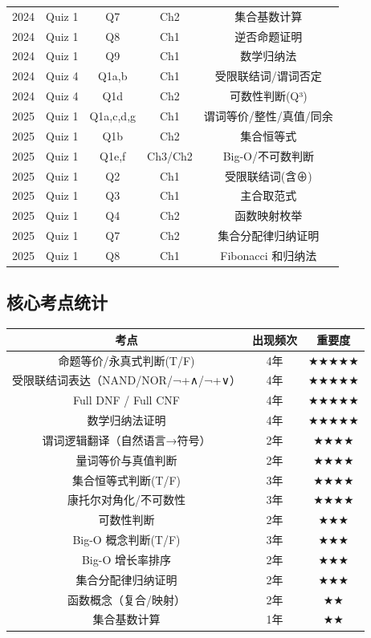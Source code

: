 \documentclass[10pt,a4paper,openany]{ctexbook}
\theoremstyle{definition}
\theoremstyle{remark}
\begin{document}
\begin{center}
\begin{tabular}{ccccc}
2024 & Quiz 1 & Q7 & Ch2 & 集合基数计算 \\
2024 & Quiz 1 & Q8 & Ch1 & 逆否命题证明 \\
2024 & Quiz 1 & Q9 & Ch1 & 数学归纳法 \\
2024 & Quiz 4 & Q1a,b & Ch1 & 受限联结词/谓词否定 \\
2024 & Quiz 4 & Q1d & Ch2 & 可数性判断(Q³) \\
2025 & Quiz 1 & Q1a,c,d,g & Ch1 & 谓词等价/整性/真值/同余 \\
2025 & Quiz 1 & Q1b & Ch2 & 集合恒等式 \\
2025 & Quiz 1 & Q1e,f & Ch3/Ch2 & Big-O/不可数判断 \\
2025 & Quiz 1 & Q2 & Ch1 & 受限联结词(含⊕) \\
2025 & Quiz 1 & Q3 & Ch1 & 主合取范式 \\
2025 & Quiz 1 & Q4 & Ch2 & 函数映射枚举 \\
2025 & Quiz 1 & Q7 & Ch2 & 集合分配律归纳证明 \\
2025 & Quiz 1 & Q8 & Ch1 & Fibonacci 和归纳法 \\
\hline
\end{tabular}

\end{center}

\vspace{-2pt}

\subsection{核心考点统计}

\begin{center}
\begin{tabular}{ccc}
\hline
考点 & 出现频次 & 重要度 \\ \hline
命题等价/永真式判断(T/F) & 4年 & ★★★★★ \\
受限联结词表达（NAND/NOR/¬+∧/¬+∨） & 4年 & ★★★★★ \\
Full DNF / Full CNF & 4年 & ★★★★★ \\
数学归纳法证明 & 4年 & ★★★★★ \\
谓词逻辑翻译（自然语言→符号） & 2年 & ★★★★ \\
量词等价与真值判断 & 2年 & ★★★★ \\
集合恒等式判断(T/F) & 3年 & ★★★★ \\
康托尔对角化/不可数性 & 3年 & ★★★★ \\
可数性判断 & 2年 & ★★★ \\
Big-O 概念判断(T/F) & 3年 & ★★★ \\
Big-O 增长率排序 & 2年 & ★★★ \\
集合分配律归纳证明 & 2年 & ★★★ \\
函数概念（复合/映射） & 2年 & ★★ \\
集合基数计算 & 1年 & ★★ \\
\hline
\end{tabular}

\end{center}
\end{document}

